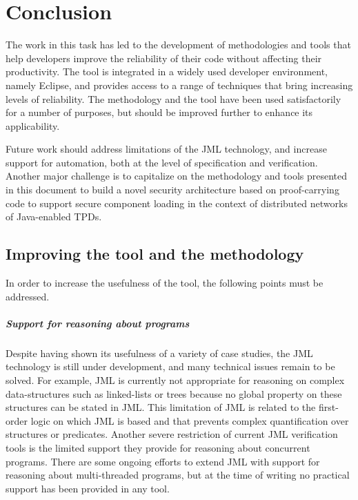 \newcommand{\compil}[2]{\overline{#1}^{#2}}

\newcommand{\compilp}[1]{{\cal C}(#1)}


\chapter{Conclusion} 

The work in this task has led to the development of methodologies and
tools that help developers improve the reliability of their code
without affecting their productivity. The tool is integrated in a
widely used developer environment, namely Eclipse, and provides access
to a range of techniques that bring increasing levels of reliability.
The methodology and the tool have been used satisfactorily for a
number of purposes, but should be improved further to enhance its
applicability.

Future work should address limitations of the JML technology, and
increase support for automation, both at the level of specification
and verification. Another major challenge is to capitalize on the 
methodology and tools presented in this document to build a novel
security architecture based on proof-carrying code to support
secure component loading in the context of distributed networks of
Java-enabled TPDs.

\section{Improving the tool and the methodology}
In order to increase the usefulness of the tool, the following
points must be addressed.

\paragraph{Support for reasoning about programs}
Despite having shown its usefulness of a variety of case studies, the
JML technology is still under development, and many technical issues
remain to be solved. For example, JML is currently not appropriate for
reasoning on complex data-structures such as linked-lists or trees
because no global property on these structures can be stated in JML.
This limitation of JML is related to the first-order logic on which
JML is based and that prevents complex quantification over structures
or predicates. Another severe restriction of current JML verification
tools is the limited support they provide for reasoning about
concurrent programs.  There are some ongoing efforts to extend
JML with support for reasoning about multi-threaded programs, but
at the time of writing no practical support has been provided in any tool.


